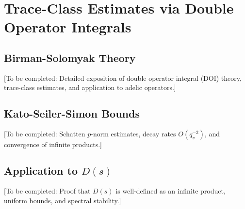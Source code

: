 \section{Trace-Class Estimates via Double Operator Integrals}

\subsection{Birman-Solomyak Theory}

[To be completed: Detailed exposition of double operator integral (DOI) theory, trace-class estimates, and application to adelic operators.]

\subsection{Kato-Seiler-Simon Bounds}

[To be completed: Schatten $p$-norm estimates, decay rates $O(q_v^{-2})$, and convergence of infinite products.]

\subsection{Application to $D(s)$}

[To be completed: Proof that $D(s)$ is well-defined as an infinite product, uniform bounds, and spectral stability.]

